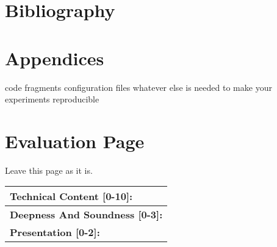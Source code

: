 \section*{Bibliography}

\section*{Appendices}

\bi
\ii code fragments
\ii configuration files
\ii whatever else is needed to make your experiments reproducible
\ei

\newpage
\section*{Evaluation Page}

\thispagestyle{plain} 

Leave this page as it is.

\begin{tabular}{|p{14cm}|}
\hline
\textbf{Technical Content [0-10]:}\vspace{5cm}\\

\hline
\textbf{Deepness And Soundness [0-3]:}\vspace{5cm}\\
\hline
\textbf{Presentation [0-2]:}\vspace{5cm}\\
\hline
\end{tabular}